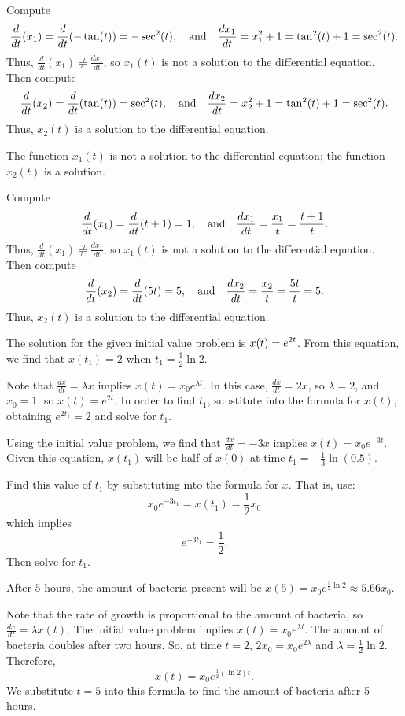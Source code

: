 \soln Compute
\[
\frac{d}{dt}(x_1) = \frac{d}{dt}(-\tan(t)) = -\sec^2(t), \quad\mbox{and}\quad
\frac{dx_1}{dt} = x_1^2 + 1 = \tan^2(t) + 1 = \sec^2(t).
\]
Thus, $\frac{d}{dt}(x_1) \neq \frac{dx_1}{dt}$, so $x_1(t)$ is not a
solution to the differential equation.  Then compute
\[
\frac{d}{dt}(x_2) = \frac{d}{dt}(\tan(t)) = \sec^2(t), \quad\mbox{and}\quad
\frac{dx_2}{dt} = x_2^2 + 1 = \tan^2(t) + 1 = \sec^2(t).
\]
Thus, $x_2(t)$ is a solution to the differential equation. 

\ans The function $x_1(t)$ is not a solution to the differential equation;
the function $x_2(t)$ is a solution.

\soln Compute
\[
\frac{d}{dt}(x_1) = \frac{d}{dt}(t + 1) = 1, \quad\mbox{and}\quad
\frac{dx_1}{dt} = \frac{x_1}{t} = \frac{t + 1}{t}.
\]
Thus, $\frac{d}{dt}(x_1) \neq \frac{dx_1}{dt}$, so $x_1(t)$ is not a
solution to the differential equation.  Then compute
\[
\frac{d}{dt}(x_2) = \frac{d}{dt}(5t) = 5, \quad\mbox{and}\quad
\frac{dx_2}{dt} = \frac{x_2}{t} = \frac{5t}{t} = 5.
\]
Thus, $x_2(t)$ is a solution to the differential equation.

\ans The solution for the given initial value problem is
$\displaystyle x(t) = e^{2t}$.  From this equation, we find that $x(t_1) = 2$
when $t_1 = \frac{1}{2}\ln 2$.

\soln Note that $\frac{dx}{dt} = \lambda x$ implies $x(t) =
x_0e^{\lambda t}$.  In this case, $\frac{dx}{dt} = 2x$, so
$\lambda = 2$, and $x_0 = 1$, so $x(t) = e^{2t}$.  In order to
find $t_1$, substitute into the formula for $x(t)$, obtaining
$e^{2t_1} = 2$ and solve for $t_1$.

\ans Using the initial value problem, we find that $\frac{dx}{dt} = -3x$
implies $x(t) = x_0e^{-3t}$.  Given this equation, $x(t_1)$ will be half
of $x(0)$ at time $t_1 = -\frac{1}{3} \ln(0.5)$.

\soln Find this value of $t_1$ by substituting into the formula for $x$. 
That is, use:
\[
x_0e^{-3t_1} = x(t_1) = \frac{1}{2}x_0
\]
which implies
\[ e^{-3t_1} = \frac{1}{2}. \]
Then solve for $t_1$.

\ans After $5$ hours, the amount of bacteria present will be
$x(5) = x_0e^{\frac{5}{2} \ln 2} \approx 5.66x_0$.

\soln Note that the rate of growth is proportional to the amount of
bacteria, so $\frac{dx}{dt} = \lambda x(t)$.  The initial value problem
implies $x(t) = x_0e^{\lambda t}$.  The amount of bacteria doubles after
two hours.  So, at time $t = 2$, $2x_0 = x_0e^{2\lambda}$ and
$\lambda = \frac{1}{2} \ln 2$.  Therefore,
\[ x(t) = x_0e^{\frac{1}{2} (\ln 2)t}. \]
We substitute $t = 5$ into this formula to find the amount of
bacteria after 5 hours.

